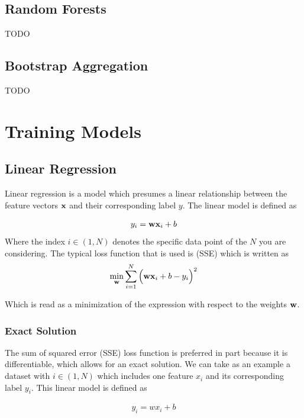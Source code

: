 \subsection{Random Forests}
TODO
\subsection{Bootstrap Aggregation}
TODO


\section{Training Models}


\subsection{Linear Regression}
Linear regression is a model which presumes a linear relationship between the feature vectors $\textbf{x}$ and their corresponding label $y$. The linear model is defined as

\begin{align}
    y_i = \textbf{wx}_i +b
\end{align}
Where the index $i\in(1,N)$ denotes the specific data point of the $N$ you are considering. The typical loss function that is used is  (SSE) which is written as
\begin{align}
    	\min_{\textbf{w}}\sum_{i=1}^N\Big(\textbf{wx}_i +b - y_i\Big)^2
\end{align}

Which is read as a minimization of the expression with respect to the weights $\textbf{w}$. 


\subsubsection{Exact Solution}\label{lin-reg-exact}
The sum of squared error (SSE) loss function is preferred in part because it is differentiable, which allows for an exact solution. We can take as an example a dataset with $i\in(1,N)$ which includes one feature $x_i$ and its corresponding label $y_i$. This linear model is defined as

\begin{align}
y_i = wx_i + b
\end{align}

